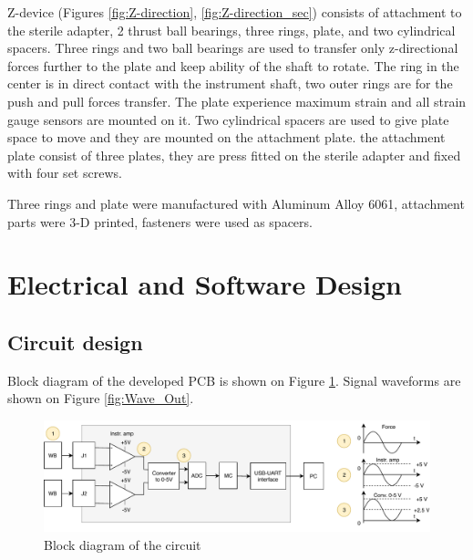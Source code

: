 Z-device (Figures \ref{fig:Z-direction}, \ref{fig:Z-direction_sec}) consists of attachment to the sterile adapter, 2 thrust ball bearings, three rings, plate, and two cylindrical spacers. Three rings and two ball bearings are used to transfer only z-directional forces further to the plate and keep ability of the shaft to rotate. The ring in the center is in direct contact with the instrument shaft, two outer rings are for the push and pull forces transfer. The plate experience maximum strain and all strain gauge sensors are mounted on it.  Two cylindrical spacers are used to give plate space to move and they are mounted on the attachment plate. the attachment plate consist of three plates, they are press fitted on the sterile adapter and fixed with four set screws.

Three rings and plate were manufactured with Aluminum Alloy 6061, attachment parts were 3-D printed, fasteners were used as spacers.


\section{Electrical and Software Design}
\label{sec:elecDes}

	\subsection{Circuit design}
	\label{sec:cirDes}
	Block diagram of the developed PCB is shown on Figure \ref{fig:PCB_block_diag}. Signal waveforms are shown on Figure \ref{fig:Wave_Out}.

\begin{figure}[h]
	\begin{center}
		\includegraphics[width=150mm]{fig/methods/PSC_block_wave.pdf}
	\end{center}
	\vspace{-4mm}
	\caption[Block diagram of the circuit]
	{Block diagram of the circuit}
	\label{fig:PCB_block_diag}
	\vspace{-2mm}
\end{figure}

